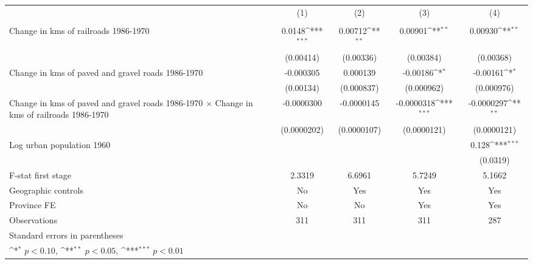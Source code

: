 {
\def\sym#1{\ifmmode^{#1}\else\(^{#1}\)\fi}
\begin{tabular}{l*{4}{c}}
\hline\hline
                &\multicolumn{1}{c}{(1)}&\multicolumn{1}{c}{(2)}&\multicolumn{1}{c}{(3)}&\multicolumn{1}{c}{(4)}\\
                &\multicolumn{1}{c}{}&\multicolumn{1}{c}{}&\multicolumn{1}{c}{}&\multicolumn{1}{c}{}\\
\hline
Change in kms of railroads 1986-1970&   0.0148\sym{***}&  0.00712\sym{**} &  0.00901\sym{**} &  0.00930\sym{**} \\
                &(0.00414)         &(0.00336)         &(0.00384)         &(0.00368)         \\
[1em]
Change in kms of paved and gravel roads 1986-1970&-0.000305         & 0.000139         & -0.00186\sym{*}  & -0.00161\sym{*}  \\
                &(0.00134)         &(0.000837)         &(0.000962)         &(0.000976)         \\
[1em]
Change in kms of paved and gravel roads 1986-1970 $\times$ Change in kms of railroads 1986-1970&-0.0000300         &-0.0000145         &-0.0000318\sym{***}&-0.0000297\sym{**} \\
                &(0.0000202)         &(0.0000107)         &(0.0000121)         &(0.0000121)         \\
[1em]
Log urban population 1960&                  &                  &                  &    0.128\sym{***}\\
                &                  &                  &                  & (0.0319)         \\
\hline
F-stat first stage&   2.3319         &   6.6961         &   5.7249         &   5.1662         \\
Geographic controls&       No         &      Yes         &      Yes         &      Yes         \\
Province FE     &       No         &       No         &      Yes         &      Yes         \\
Observations    &      311         &      311         &      311         &      287         \\
\hline\hline
\multicolumn{5}{l}{\footnotesize Standard errors in parentheses}\\
\multicolumn{5}{l}{\footnotesize \sym{*} \(p<0.10\), \sym{**} \(p<0.05\), \sym{***} \(p<0.01\)}\\
\end{tabular}
}
